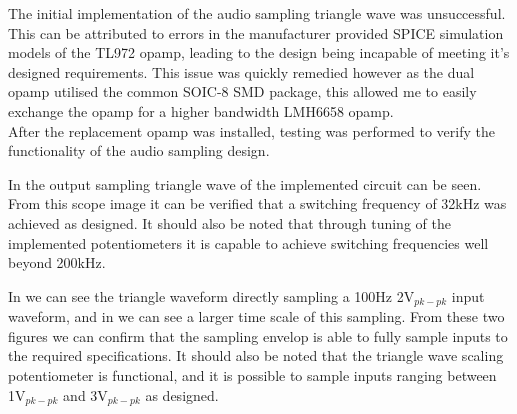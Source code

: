 \documentclass[a4paper,11pt]{article}
\begin{document}
The initial implementation of the audio sampling triangle wave was unsuccessful. This can be attributed to errors in the manufacturer provided SPICE simulation models of the TL972 opamp, leading to the design being incapable of meeting it's designed requirements. This issue was quickly remedied however as the dual opamp utilised the common SOIC-8 SMD package, this allowed me to easily exchange the opamp for a higher bandwidth LMH6658 opamp. \\

After the replacement opamp was installed, testing was performed to verify the functionality of the audio sampling design. 

In  the output sampling triangle wave of the implemented circuit can be seen. From this scope image it can be verified that a switching frequency of 32kHz was achieved as designed. It should also be noted that through tuning of the implemented potentiometers it is capable to achieve switching frequencies well beyond 200kHz.

In  we can see the triangle waveform directly sampling a 100Hz 2V$_{pk-pk}$ input waveform, and in  we can see a larger time scale of this sampling. From these two figures we can confirm that the sampling envelop is able to fully sample inputs to the required specifications. It should also be noted that the triangle wave scaling potentiometer is functional, and it is possible to sample inputs ranging between 1V$_{pk-pk}$ and 3V$_{pk-pk}$ as designed.
\end{document}
